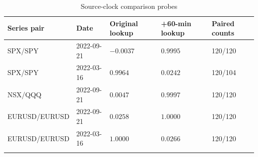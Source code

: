 \begin{table}[htbp]
\centering
{\fontsize{9.6}{12}\selectfont\renewcommand{\arraystretch}{1.22}\setlength{\tabcolsep}{4pt}
\begin{tabularx}{\linewidth}{@{}L{30mm}L{29mm}C{32mm}C{32mm}X@{}}
\toprule{}
\textbf{Series pair} & \textbf{Date} & \textbf{Original lookup} & \textbf{+60-min lookup} & \textbf{Paired counts} \\ \midrule
SPX/SPY & 2022-09-21 & $-0.0037$ & $0.9995$ & 120/120 \\ \hline
SPX/SPY & 2022-03-16 & $0.9964$ & $0.0242$ & 120/104 \\ \hline
NSX/QQQ & 2022-09-21 & $0.0047$ & $0.9997$ & 120/120 \\ \hline
EURUSD/EURUSD & 2022-09-21 & $0.0258$ & $1.0000$ & 120/120 \\ \hline
EURUSD/EURUSD & 2022-03-16 & $1.0000$ & $0.0266$ & 120/120 \\ \hline
{}\bottomrule\end{tabularx}}
\caption[Source-clock comparison probes]{Source-clock comparison probes}\label{tab:clock}
\end{table}
